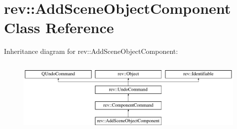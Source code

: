 \hypertarget{classrev_1_1_add_scene_object_component}{}\section{rev\+::Add\+Scene\+Object\+Component Class Reference}
\label{classrev_1_1_add_scene_object_component}
Inheritance diagram for rev\+::Add\+Scene\+Object\+Component\+:\begin{figure}[H]
\begin{center}
\leavevmode
\includegraphics[height=3.660131cm]{classrev_1_1_add_scene_object_component}
\end{center}
\end{figure}
